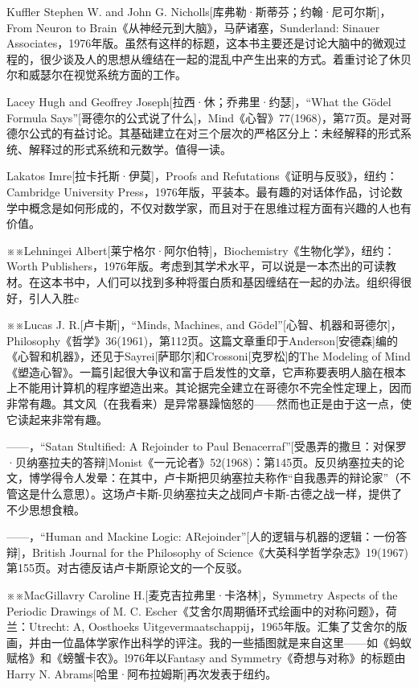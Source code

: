 \documentclass[
  12pt,
  twoside,
  openright,
  oldfontcommands,
]{memoir}
\begin{document}
Kuffler Stephen W. and John G. Nicholls{[}库弗勒·斯蒂芬；约翰·尼可尔斯{]}，From Neuron to Brain《从神经元到大脑》，马萨诸塞，Sunderland: Sinauer Associates，1976年版。虽然有这样的标题，这本书主要还是讨论大脑中的微观过程的，很少谈及人的思想从缠结在一起的混乱中产生出来的方式。着重讨论了休贝尔和威瑟尔在视觉系统方面的工作。

Lacey Hugh and Geoffrey Joseph{[}拉西·休；乔弗里·约瑟{]}，``What the Gödel Formula Says''{[}哥德尔的公式说了什么{]}，Mind《心智》77(1968)，第77页。是对哥德尔公式的有益讨论。其基础建立在对三个层次的严格区分上：未经解释的形式系统、解释过的形式系统和元数学。值得一读。

Lakatos Imre{[}拉卡托斯·伊莫{]}，Proofs and Refutations《证明与反驳》，纽约：Cambridge University Press，1976年版，平装本。最有趣的对话体作品，讨论数学中概念是如何形成的，不仅对数学家，而且对于在思维过程方面有兴趣的人也有价值。

※※Lehningei Albert{[}莱宁格尔·阿尔伯特{]}，Biochemistry《生物化学》，纽约：Worth Publishers，1976年版。考虑到其学术水平，可以说是一本杰出的可读教材。在这本书中，人们可以找到多种将蛋白质和基因缠结在一起的办法。组织得很好，引人入胜c

※※Lucas J. R.{[}卢卡斯{]}，``Minds, Machines, and Gödel''{[}心智、机器和哥德尔{]}，Philosophy《哲学》36(1961)，第112页。这篇文章重印于Anderson{[}安德森{]}编的《心智和机器》，还见于Sayrei{[}萨耶尔{]}和Crossoni{[}克罗松{]}的The Modeling of Mind《塑造心智》。一篇引起很大争议和富于启发性的文章，它声称要表明人脑在根本上不能用计算机的程序塑造出来。其论据完全建立在哥德尔不完全性定理上，因而非常有趣。其文风（在我看来）是异常暴躁恼怒的------然而也正是由于这一点，使它读起来非常有趣。

------，``Satan Stultified: A Rejoinder to Paul Benacerraf''{[}受愚弄的撒旦：对保罗·贝纳塞拉夫的答辩{]}Monist《一元论者》52(1968)：第145页。反贝纳塞拉夫的论文，博学得令人发晕：在其中，卢卡斯把贝纳塞拉夫称作``自我愚弄的辩论家''（不管这是什么意思）。这场卢卡斯-贝纳塞拉夫之战同卢卡斯-古德之战一样，提供了不少思想食粮。

------，``Human and Mackine Logic: ARejoinder''{[}人的逻辑与机器的逻辑：一份答辩{]}，British Journal for the Philosophy of Science《大英科学哲学杂志》19(1967)第155页。对古德反诘卢卡斯原论文的一个反驳。

※※MacGillavry Caroline H.{[}麦克吉拉弗里·卡洛林{]}，Symmetry Aspects of the Periodic Drawings of M. C. Escher《艾舍尔周期循环式绘画中的对称问题》，荷兰：Utrecht: A, Oosthoek\textquotesingle s Uitgevermaatschappij，1965年版。汇集了艾舍尔的版画，并由一位晶体学家作出科学的评注。我的一些插图就是来自这里------如《蚂蚁赋格》和《螃蟹卡农》。l976年以Fantasy and Symmetry《奇想与对称》的标题由Harry N. Abrams{[}哈里·阿布拉姆斯{]}再次发表于纽约。
\end{document}
